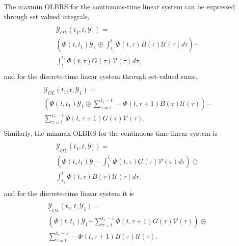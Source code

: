 \documentclass[letterpaper,10pt,english]{sphinxmanual}
\begin{document}
The maxmin OLBRS for the continuous-time linear system can be expressed
through set valued integrals,
\label{main_source:equation-ctlsmaxminb}\begin{gather}
\begin{split}\begin{array}{l}
\overline{{\mathcal Y}}_{OL}(t_1, t, {\mathcal Y}_1) = \\
\left(\Phi(t, t_1){\mathcal Y}_1 \oplus
\int_{t_1}^t\Phi(t, \tau)B(\tau){\mathcal U}(\tau)d\tau\right) \dot{-} \\
\int_{t}^{t_1}\Phi(t, \tau)G(\tau){\mathcal V}(\tau)d\tau,
\end{array}\end{split}\label{main_source-ctlsmaxminb}
\end{gather}
and for the discrete-time linear system through set-valued sums,
\label{main_source:equation-dtlsmaxminb}\begin{gather}
\begin{split}\begin{array}{l}
\overline{{\mathcal Y}}_{OL}(t_1, t, {\mathcal Y}_1) = \\
\left(\Phi(t, t_1){\mathcal Y}_1 \oplus
\sum_{\tau=t}^{t_1-1}-\Phi(t, \tau+1)B(\tau){\mathcal U}(\tau)\right) \dot{-} \\
\sum_{\tau=t}^{t_1-1}\Phi(t, \tau+1)G(\tau){\mathcal V}(\tau).
\end{array}\end{split}\label{main_source-dtlsmaxminb}
\end{gather}
Similarly, the minmax OLBRS for the continuous-time linear system is
\label{main_source:equation-ctlsminmaxb}\begin{gather}
\begin{split}\begin{array}{l}
\underline{{\mathcal Y}}_{OL}(t_1, t, {\mathcal Y}_1) = \\
\left(\Phi(t, t_1){\mathcal Y}_1 \dot{-}
\int_{t}^{t_1}\Phi(t, \tau)G(\tau){\mathcal V}(\tau)d\tau\right)
\oplus \\
\int_{t_1}^{t}\Phi(t, \tau)B(\tau){\mathcal U}(\tau)d\tau,
\end{array}\end{split}\label{main_source-ctlsminmaxb}
\end{gather}
and for the discrete-time linear system it is
\label{main_source:equation-dtlsminmaxb}\begin{gather}
\begin{split}\begin{array}{l}
\underline{{\mathcal Y}}_{OL}(t_1, t, {\mathcal Y}_1) = \\
\left(\Phi(t, t_1){\mathcal Y}_1 \dot{-}
\sum_{\tau=t}^{t_1-1}\Phi(t, \tau+1)G(\tau){\mathcal V}(\tau)\right)
\oplus \\
\sum_{\tau=t}^{t_1-1}-\Phi(t, \tau+1)B(\tau){\mathcal U}(\tau).
\end{array}\end{split}\label{main_source-dtlsminmaxb}
\end{gather}
\end{document}
